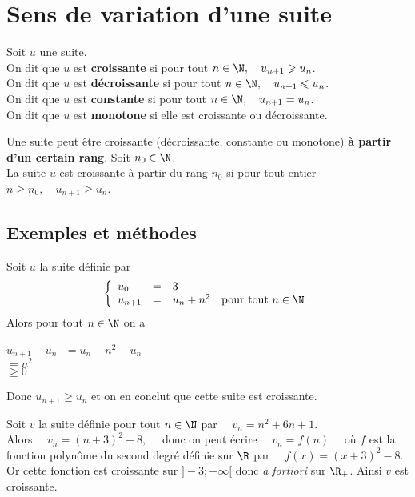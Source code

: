 \documentclass[a4paper,11pt,cours]{nsi} %
\begin{document}
\section{Sens de variation d'une suite}
\begin{definition}
	Soit $u$ une suite.\\
	On dit que $u$ est \textbf{croissante} si pour tout $ n\in\N,\quad u_{n+1}\geqslant u_n$.\\
	
	On dit que $u$ est \textbf{décroissante} si pour tout $n\in\N,\quad u_{n+1}\leqslant u_n$.\\
	
	On dit que $u$ est \textbf{constante} si pour tout $n\in\N,\quad u_{n+1}=u_n$.\\
	
	On dit que $u$ est \textbf{monotone} si elle est croissante ou décroissante.
\end{definition}

\begin{remarque}[ ]
	Une suite peut être croissante (décroissante, constante ou monotone) \textbf{à partir d'un certain rang}.
	Soit $n_0 \in\N$.\\
	La suite $u$ est croissante à partir du rang $n_0$ si pour tout entier $n\geqslant n_0, \quad u_{n+1}\geqslant u_n$.
\end{remarque}
\subsection*{Exemples et méthodes}
\begin{exemple}
	Soit $u$ la suite définie par
	$$\left\{
	\begin{array}{llll}
		u_0 & = & 3 & \\
		u_{n+1} & = & u_n+n^2 & \text{pour tout } n\in\N\\
	\end{array}
	\right. $$
	Alors pour tout $n\in\N$ on a
	\begin{tabbing}
		$u_{n+1}-u_n$	\=	$=u_n+n^2-u_n$\\
		\>	$=n^2$\\
		\>	$\geqslant 0$
	\end{tabbing}
	Donc $u_{n+1}\geqslant u_n$ et on en conclut que cette suite est croissante.
\end{exemple}

\begin{exemple}
	Soit $v$ la suite définie pour tout $n\in\N$ par $\quad v_n=n^2+6n+1$.\\
	Alors $\quad v_n=(n+3)^2-8,\quad$ donc on peut écrire $\quad v_n=f(n) \quad$ où $f$ est la fonction polynôme du second degré définie sur $\R$ par $\quad f(x)=(x+3)^2-8$.\\
	Or cette fonction est croissante sur $]-3;+\infty[$ donc \emph{a fortiori} sur $\R_+$. Ainsi $v$ est croissante.
\end{exemple}
\end{document}
